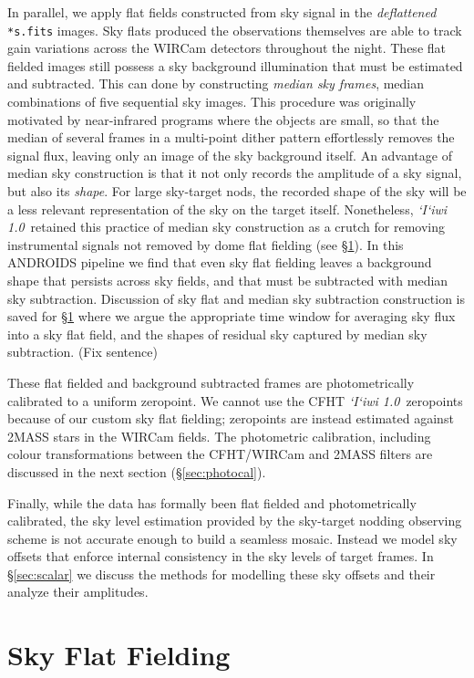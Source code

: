 \documentclass[iop]{emulateapj}
\newcommand{\sw}[1]{\textit{#1}} %
\newcommand{\iiwione}{\sw{`I`iwi 1.0}}
\newcommand{\todo}[1]{\textcolor{BurntOrange}{\textsf{#1}}} %
\newcommand{\Sec}[1]{\S\ref{sec:#1}}  %
\begin{document}
In parallel, we apply flat fields constructed from sky signal in the \textit{deflattened} \texttt{*s.fits} images.
Sky flats produced the observations themselves are able to track gain variations across the WIRCam detectors throughout the night.
These flat fielded images still possess a sky background illumination that must be estimated and subtracted.
This can done by constructing \textit{median sky frames}, median combinations of five sequential sky 
images.
This procedure was originally motivated by near-infrared programs where the objects are small, so that the median of several frames in a multi-point dither pattern effortlessly removes the signal flux, leaving only an image of the sky background itself.
An advantage of median sky construction is that it not only records the amplitude of a sky signal, but also its \emph{shape}.
For large sky-target nods, the recorded shape of the sky will be a less relevant representation of the sky on the target itself.
Nonetheless, \iiwione\ retained this practice of median sky construction as a crutch for removing instrumental signals not removed by dome flat fielding (see \Sec{flats}). In this ANDROIDS pipeline we find that even sky flat fielding leaves a background shape that persists across sky fields, and that must be subtracted with median sky subtraction.
Discussion of sky flat and median sky subtraction construction is saved for \Sec{flats} where we argue the appropriate time window for averaging sky flux into a sky flat field, and the shapes of residual sky captured by median sky subtraction. \todo{(Fix sentence)}

These flat fielded and background subtracted frames are photometrically calibrated to a uniform zeropoint.
We cannot use the CFHT \iiwione\ zeropoints because of our custom sky flat fielding; zeropoints are instead estimated against 2MASS stars in the WIRCam fields.
The photometric calibration, including colour transformations between the CFHT/WIRCam and 2MASS filters are discussed in the next section (\Sec{photocal}).

Finally, while the data has formally been flat fielded and photometrically calibrated, the sky level estimation provided by the sky-target nodding observing scheme is not accurate enough to build a seamless mosaic.
Instead we model sky offsets that enforce internal consistency in the sky levels of target frames.
In \Sec{scalar} we discuss the methods for modelling these sky offsets and their analyze their amplitudes.

\section{Sky Flat Fielding}
\label{sec:flats}
\end{document}
